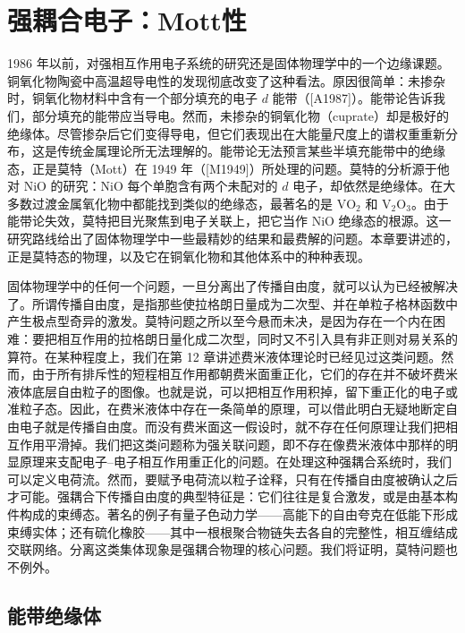 \chapter{强耦合电子：Mott性}

1986 年以前，对强相互作用电子系统的研究还是固体物理学中的一个边缘课题。铜氧化物陶瓷中高温超导电性的发现彻底改变了这种看法。原因很简单：未掺杂时，铜氧化物材料中含有一个部分填充的电子 $d$ 能带（[A1987]）。能带论告诉我们，部分填充的能带应当导电。然而，未掺杂的铜氧化物（cuprate）却是极好的绝缘体。尽管掺杂后它们变得导电，但它们表现出在大能量尺度上的谱权重重新分布，这是传统金属理论所无法理解的。能带论无法预言某些半填充能带中的绝缘态，正是莫特（Mott）在 1949 年（[M1949]）所处理的问题。莫特的分析源于他对 NiO 的研究：NiO 每个单胞含有两个未配对的 $d$ 电子，却依然是绝缘体。在大多数过渡金属氧化物中都能找到类似的绝缘态，最著名的是 $\mathrm{VO}_2$ 和 $\mathrm{V}_2\mathrm{O}_3$。由于能带论失效，莫特把目光聚焦到电子关联上，把它当作 NiO 绝缘态的根源。这一研究路线给出了固体物理学中一些最精妙的结果和最费解的问题。本章要讲述的，正是莫特态的物理，以及它在铜氧化物和其他体系中的种种表现。

固体物理学中的任何一个问题，一旦分离出了传播自由度，就可以认为已经被解决了。所谓传播自由度，是指那些使拉格朗日量成为二次型、并在单粒子格林函数中产生极点型奇异的激发。莫特问题之所以至今悬而未决，是因为存在一个内在困难：要把相互作用的拉格朗日量化成二次型，同时又不引入具有非正则对易关系的算符。在某种程度上，我们在第 12 章讲述费米液体理论时已经见过这类问题。然而，由于所有排斥性的短程相互作用都朝费米面重正化，它们的存在并不破坏费米液体底层自由粒子的图像。也就是说，可以把相互作用积掉，留下重正化的电子或准粒子态。因此，在费米液体中存在一条简单的原理，可以借此明白无疑地断定自由电子就是传播自由度。而没有费米面这一假设时，就不存在任何原理让我们把相互作用平滑掉。我们把这类问题称为强关联问题，即不存在像费米液体中那样的明显原理来支配电子--电子相互作用重正化的问题。在处理这种强耦合系统时，我们可以定义电荷流。然而，要赋予电荷流以粒子诠释，只有在传播自由度被确认之后才可能。强耦合下传播自由度的典型特征是：它们往往是复合激发，或是由基本构件构成的束缚态。著名的例子有量子色动力学——高能下的自由夸克在低能下形成束缚实体；还有硫化橡胶——其中一根根聚合物链失去各自的完整性，相互缠结成交联网络。分离这类集体现象是强耦合物理的核心问题。我们将证明，莫特问题也不例外。

\section{能带绝缘体}

